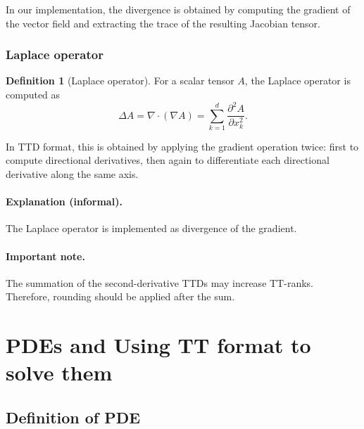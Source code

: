 \documentclass[11pt,a4paper,parskip=half-]{scrartcl}
\theoremstyle{definition}
\newtheorem{definition}{Definition}[section]
\theoremstyle{plain}
\theoremstyle{remark}
\begin{document}
In our implementation, the divergence is obtained by computing the
gradient of the vector field and extracting the trace of the resulting
Jacobian tensor.

\subsubsection{Laplace operator}

\begin{definition}[Laplace operator]

For a scalar tensor $A$, the Laplace operator is computed as
\[
\Delta A
=
\nabla \cdot (\nabla A)
=
\sum_{k=1}^d
\frac{\partial^2 A}{\partial x_k^2}.
\]

In TTD format, this is obtained by applying the gradient operation twice:
first to compute directional derivatives, then again to differentiate each
directional derivative along the same axis.

\end{definition}

\paragraph{Explanation (informal).}

The Laplace operator is implemented as divergence of the gradient.

\paragraph{Important note.}

The summation of the second-derivative TTDs may increase TT-ranks.
Therefore, rounding should be applied after the sum.

\section{PDEs and Using TT format to solve them}

\subsection{Definition of PDE}
\end{document}
